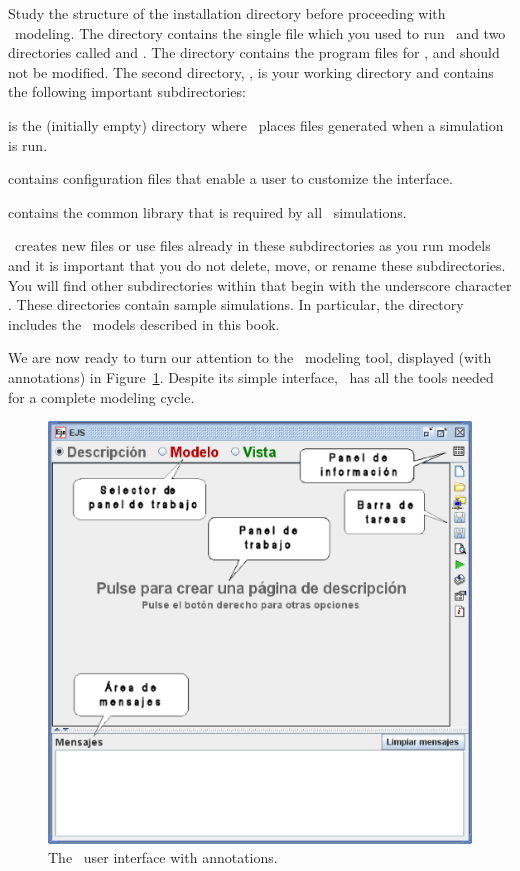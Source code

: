 Study the structure of the installation directory before proceeding with \ejs\ modeling.  The  directory contains the single file  which you used to run \ejs\ and two
directories called  and . The  directory contains the program files for \ejs,
and should not be modified. The second directory, , is your working directory and contains the
following important subdirectories:
\begin{bulletlist}
  \item {} is the (initially empty) directory where \ejs\ places files generated when a simulation is run.
  \item {} contains configuration files that enable a user to customize the interface.
  \item {} contains the common library that is required by all \ejs\ simulations.
\end{bulletlist}
\noindent \ejs\ creates new files or use files already in these subdirectories as you run models and it is important that you do not
delete, move, or rename these subdirectories. You will find other subdirectories within  that begin
with the underscore character \lit{\file{\_}}. These directories contain sample simulations. In particular, the
 directory includes the \ejs\ models described in this book.

We are now ready to turn our attention to the \ejs\ modeling tool, displayed (with annotations) in
Figure~\ref{fig:02EjsIntro/EjsInterface}. Despite its simple interface, \ejs\ has all the tools needed for a complete
modeling cycle.

\begin{figure}[htb]
  \centering
  \includegraphics[scale=\scale]{02EjsIntro/images/EjsInterface.eps}
  \caption{The \Ejs\ user interface with annotations.}
  \label{fig:02EjsIntro/EjsInterface}
\end{figure}

